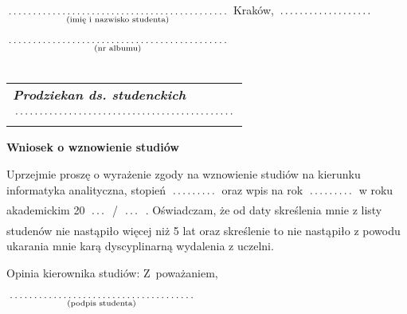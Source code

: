 \documentclass[a4paper,11pt]{article}
\newcommand{\fillField}[2]{
    $\underset{\text{#1}}{\parbox[t]{#2}{\dotfill}}$
}
\begin{document}
\noindent
\fillField{(imię i nazwisko studenta)}{7cm} \hfill Kraków, \fillField{}{3cm} \\\\
\fillField{(nr albumu)}{7cm} \\\\


\phantom{a}\hfill
\begin{tabular}[c]{@{}l@{}}
\textit{\textbf{Prodziekan ds. studenckich}} \\\\
\fillField{}{7cm}
\end{tabular}

\vskip 2.0cm

\begin{center}
{\Large \textbf{Wniosek o wznowienie studiów}}
\end{center}

\vskip 0.5cm

Uprzejmie proszę o wyrażenie zgody na wznowienie studiów na kierunku informatyka analityczna, stopień \fillField{}{1.5cm} oraz wpis na rok \fillField{}{1.5cm} w roku akademickim 20\fillField{}{0.6cm}/\fillField{}{0.6cm}. Oświadczam, że od daty skreślenia mnie z listy studenów nie nastąpiło więcej niż 5 lat oraz skreślenie to nie nastąpiło z powodu ukarania mnie karą dyscyplinarną wydalenia z uczelni.

\vskip 2.0cm

\noindent
Opinia kierownika studiów: \hspace{\fill} Z~poważaniem, \hspace{2.8cm} \\\\
\null\hfill\fillField{(podpis studenta)}{6cm}%
\vskip 4.0cm
\end{document}
